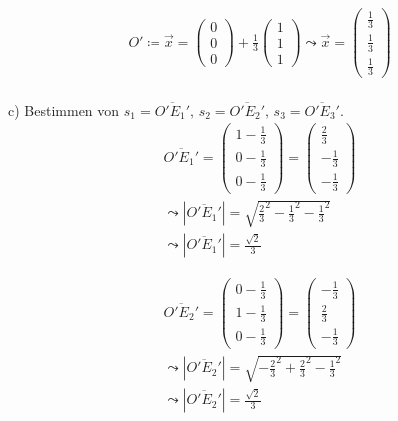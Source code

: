 \begin{gather}
O'\coloneqq \vec{x} = \begin{pmatrix}
0\\0\\0
\end{pmatrix}+\ensuremath{\frac{1}{3}} \begin{pmatrix}
1\\1\\1
\end{pmatrix} 
\leadsto \vec{x} =
\begin{pmatrix}
\ensuremath{\frac{1}{3}}\\\ensuremath{\frac{1}{3}}\\\ensuremath{\frac{1}{3}}
\end{pmatrix}
\end{gather}\\

c) Bestimmen von \ensuremath{s_1 = \overline{O'E_1'},\, s_2 = \overline{O'E_2'},\, s_3 = \overline{O'E_3'}}.\\

\begin{gather}
	\overline{O'E_1'} = \begin{pmatrix}
	1-\frac{1}{3}\\0-\frac{1}{3}\\0-\frac{1}{3}
	\end{pmatrix} 
	=
	\begin{pmatrix}
	\frac{2}{3}\\-\frac{1}{3}\\-\frac{1}{3}
	\end{pmatrix}\\
	\leadsto
	|\overline{O'E_1'}| = \sqrt{{\frac{2}{3}}^2 -{\frac{1}{3}}^2 -{\frac{1}{3}}^2}\\
		\leadsto
	|\overline{O'E_1'}| = \frac{\sqrt{2}}{3}	
\end{gather}

\begin{gather}
\overline{O'E_2'} = \begin{pmatrix}
0-\frac{1}{3}\\1-\frac{1}{3}\\0-\frac{1}{3}
\end{pmatrix} 
=
\begin{pmatrix}
-\frac{1}{3}\\\frac{2}{3}\\-\frac{1}{3}
\end{pmatrix}\\
\leadsto
|\overline{O'E_2'}| = \sqrt{{-\frac{2}{3}}^2 +{\frac{2}{3}}^2 -{\frac{1}{3}}^2}\\
\leadsto
|\overline{O'E_2'}| = \frac{\sqrt{2}}{3}
\end{gather}

